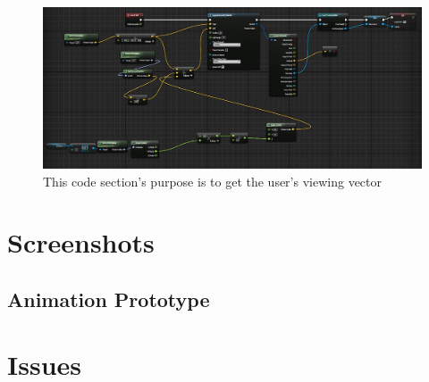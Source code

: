 \documentclass[11pt]{book}
\begin{document}
\begin{figure}
	\caption{This code section's purpose is to get the user's viewing vector}
	\includegraphics[scale=1.0]{TextDescription1.png}
\end{figure}

\section*{Screenshots}
\subsection*{Animation Prototype}


\section*{Issues}
\end{document}
